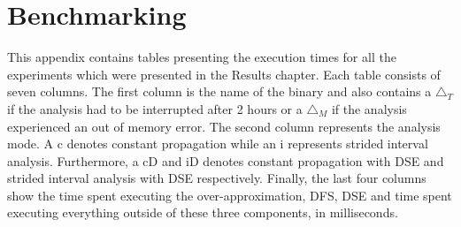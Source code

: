 \documentclass{kththesis}
\begin{document}
\begin{otherlanguage}{australian}%
\printbibliography[heading=bibintoc]
\end{otherlanguage}

\appendix
\chapter{Benchmarking}
This appendix contains tables presenting the execution times for all the experiments which were presented in the Results chapter. Each table consists of seven columns. The first column is the name of the binary and also contains a $\triangle_{T}$ if the analysis had to be interrupted after 2 hours or a $\triangle_{M}$ if the analysis experienced an out of memory error. The second column represents the analysis mode. A c denotes constant propagation while an i represents strided interval analysis. Furthermore, a cD and iD denotes constant propagation with DSE and strided interval analysis with DSE respectively. Finally, the last four columns show the time spent executing the over-approximation, DFS, DSE and time spent executing everything outside of these three components, in milliseconds.
\\ \\
\end{document}
